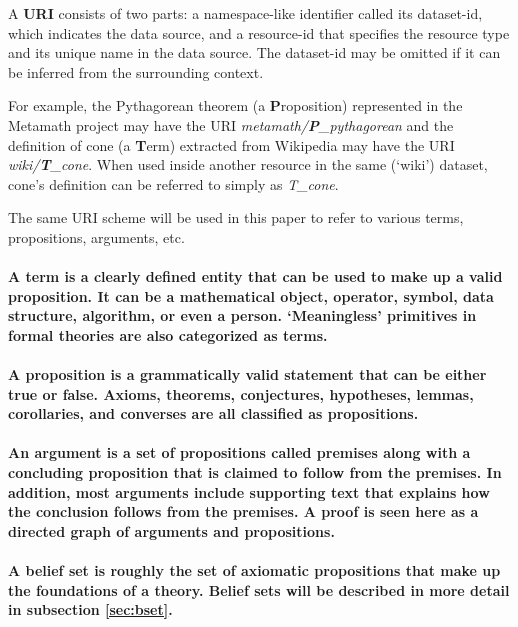 \documentclass[a4paper]{article}
\begin{document}
A \textbf{URI} consists of two parts: a namespace-like identifier called its dataset-id, which indicates the data source, and a resource-id that specifies the resource type and its unique name in the data source. The dataset-id may be omitted if it can be inferred from the surrounding context.

For example, the Pythagorean theorem (a \textbf{P}roposition) represented in the Metamath project may have the URI \emph{metamath/\textbf{P}\_pythagorean} and the definition of cone (a \textbf{T}erm) extracted from Wikipedia may have the URI \emph{wiki/\textbf{T}\_cone}. When used inside another resource in the same (`wiki') dataset, cone's definition can be referred to simply as \emph{T\_cone}.

The same URI scheme will be used in this paper to refer to various terms, propositions, arguments, etc.

\paragraph{A \textbf{term} is a clearly defined entity that can be used to make up a valid proposition. It can be a mathematical object, operator, symbol, data structure, algorithm, or even a person. `Meaningless' primitives in formal theories are also categorized as terms.}

\paragraph{A \textbf{proposition} is a grammatically valid statement that can be either true or false. Axioms, theorems, conjectures, hypotheses, lemmas, corollaries, and converses are all classified as propositions.}

\paragraph{An \textbf{argument} is a set of propositions called premises along with a concluding proposition that is claimed to follow from the premises. In addition, most arguments include supporting text that explains how the conclusion follows from the premises. A proof is seen here as a directed graph of arguments and propositions.}

\paragraph{A \textbf{belief set} is roughly the set of axiomatic propositions that make up the foundations of a theory. Belief sets will be described in more detail in subsection \ref{sec:bset}.}
\end{document}
